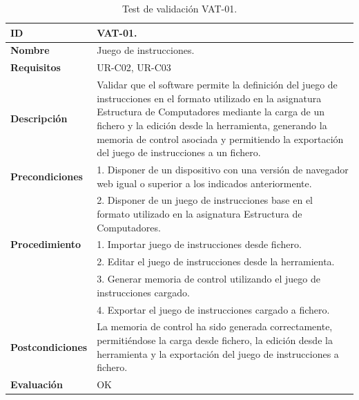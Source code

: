 \begin{center}
\begin{table}[htbp]
\centering
\caption{Test de validación VAT-01.}
\begin{tabular}{@{}p{2.5cm} p{13cm}@{}} 
\toprule
\textbf{ID} 					& VAT-01. \\
\midrule
\textbf{Nombre} 				& Juego de instrucciones. \\
\midrule
\textbf{Requisitos} 		& UR-C02, UR-C03 \\
\midrule
\textbf{Descripción} 		& Validar que el \gls{software} permite la definición del juego de instrucciones en el formato utilizado en la asignatura Estructura de Computadores mediante la carga de un fichero y la edición desde la herramienta, generando la memoria de control asociada y permitiendo la exportación del juego de instrucciones a un fichero. \\
\midrule
\textbf{Precondiciones}		& 1. Disponer de un dispositivo con una versión de navegador web igual o superior a los indicados anteriormente. \\
											& 2. Disponer de un juego de instrucciones base en el formato utilizado en la asignatura Estructura de Computadores. \\
\midrule
\textbf{Procedimiento}		& 1. Importar juego de instrucciones desde fichero.\\
											& 2. Editar el juego de instrucciones desde la herramienta.\\
											& 3. Generar memoria de control utilizando el juego de instrucciones cargado.\\
											& 4. Exportar el juego de instrucciones cargado a fichero. \\
\midrule
\textbf{Postcondiciones} 		&  La memoria de control ha sido generada correctamente, permitiéndose la carga desde fichero, la edición desde la herramienta y la exportación del juego de instrucciones a fichero.\\
\midrule
\textbf{Evaluación} 			& OK \\
\bottomrule
\end{tabular}
\label{tab:vat-01}
\end{table}
\end{center}


